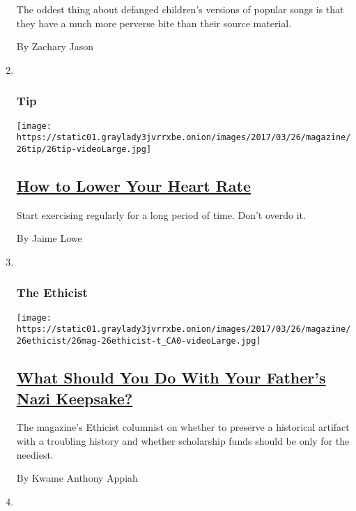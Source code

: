 \begin{enumerate}
  The oddest thing about defanged children's versions of popular songs
  is that they have a much more perverse bite than their source
  material.

  By Zachary Jason
\item ~
  \hypertarget{tip}{%
  \subsubsection{Tip}\label{tip}}

  \texttt{[image: https://static01.graylady3jvrrxbe.onion/images/2017/03/26/magazine/26tip/26tip-videoLarge.jpg]}

  \hypertarget{how-to-lower-your-heart-rate}{%
  \subsection{\texorpdfstring{\href{/2017/03/24/magazine/how-to-lower-your-heart-rate.html}{How
  to Lower Your Heart
  Rate}}{How to Lower Your Heart Rate}}\label{how-to-lower-your-heart-rate}}

  Start exercising regularly for a long period of time. Don't overdo it.

  By Jaime Lowe
\item ~
  \hypertarget{the-ethicist}{%
  \subsubsection{The Ethicist}\label{the-ethicist}}

  \texttt{[image: https://static01.graylady3jvrrxbe.onion/images/2017/03/26/magazine/26ethicist/26mag-26ethicist-t\_CA0-videoLarge.jpg]}

  \hypertarget{what-should-you-do-with-your-fathers-nazi-keepsake}{%
  \subsection{\texorpdfstring{\href{/2017/03/22/magazine/what-should-you-do-with-your-fathers-nazi-keepsake.html}{What
  Should You Do With Your Father's Nazi
  Keepsake?}}{What Should You Do With Your Father's Nazi Keepsake?}}\label{what-should-you-do-with-your-fathers-nazi-keepsake}}

  The magazine's Ethicist columnist on whether to preserve a historical
  artifact with a troubling history and whether scholarship funds should
  be only for the neediest.

  By Kwame Anthony Appiah
\item ~
  \hypertarget{judge-john-hodgman}{%
}
\end{enumerate}
